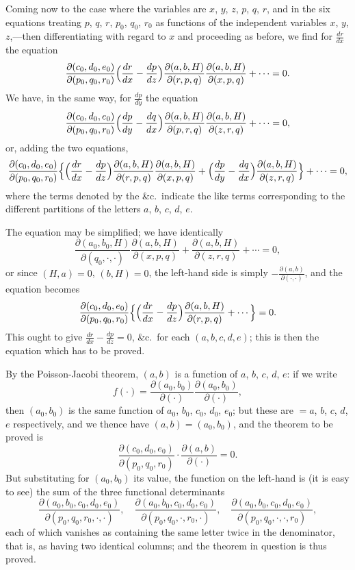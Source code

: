 \documentclass[11pt,a4paper]{book}
\begin{document}
Coming now to the case where the variables are $x$, $y$, $z$, $p$, $q$, $r$, and in the six equations treating $p$, $q$, $r$, $p_0$, $q_0$, $r_0$ as functions of the independent variables $x$, $y$, $z$,---then differentiating with regard to $x$ and proceeding as before, we find for $\frac{dr}{dx}$ the equation
\[
\frac{\partial(c_0, d_0, e_0)}{\partial(p_0, q_0, r_0)} \Bigl(\frac{dr}{dx} - \frac{dp}{dz}\Bigr) \frac{\partial(a, b, H)}{\partial(r, p, q)} \frac{\partial(a, b, H)}{\partial(x, p, q)} + \cdots = 0.
\]
We have, in the same way, for $\frac{dp}{dy}$ the equation
\[
\frac{\partial(c_0, d_0, e_0)}{\partial(p_0, q_0, r_0)} \Bigl(\frac{dp}{dy} - \frac{dq}{dx}\Bigr) \frac{\partial(a, b, H)}{\partial(p, r, q)} \frac{\partial(a, b, H)}{\partial(z, r, q)} + \cdots = 0,
\]
or, adding the two equations,
\[
\frac{\partial(c_0, d_0, e_0)}{\partial(p_0, q_0, r_0)} \Bigl\{\Bigl(\frac{dr}{dx} - \frac{dp}{dz}\Bigr) \frac{\partial(a, b, H)}{\partial(r, p, q)} \frac{\partial(a, b, H)}{\partial(x, p, q)} + \Bigl(\frac{dp}{dy} - \frac{dq}{dx}\Bigr) \frac{\partial(a, b, H)}{\partial(z, r, q)}\Bigr\} + \cdots = 0,
\]
where the terms denoted by the \&c.~indicate the like terms corresponding to the different partitions of the letters $a$, $b$, $c$, $d$, $e$.

The equation may be simplified; we have identically
\[
\frac{\partial(a_0, b_0, H)}{\partial(q_0, \cdot, \cdot)} \frac{\partial(a, b, H)}{\partial(x, p, q)} + \frac{\partial(a, b, H)}{\partial(z, r, q)} + \cdots = 0,
\]
or since $(H, a) = 0$, $(b, H) = 0$, the left-hand side is simply $-\frac{\partial(a, b)}{\partial(\cdot, \cdot)}$, and the equation becomes
\[
\frac{\partial(c_0, d_0, e_0)}{\partial(p_0, q_0, r_0)} \Bigl\{\Bigl(\frac{dr}{dx} - \frac{dp}{dz}\Bigr) \frac{\partial(a, b, H)}{\partial(r, p, q)} + \cdots\Bigr\} = 0.
\]
This ought to give $\frac{dr}{dx} - \frac{dp}{dz} = 0$, \&c.~for each $(a, b, c, d, e)$; this is then the equation which has to be proved.

By the Poisson-Jacobi theorem, $(a, b)$ is a function of $a$, $b$, $c$, $d$, $e$: if we write
\[
f(\cdot) = \frac{\partial(a_0, b_0)}{\partial(\cdot)} \frac{\partial(a_0, b_0)}{\partial(\cdot)},
\]
then $(a_0, b_0)$ is the same function of $a_0$, $b_0$, $c_0$, $d_0$, $e_0$; but these are $= a$, $b$, $c$, $d$, $e$ respectively, and we thence have $(a, b) = (a_0, b_0)$, and the theorem to be proved is
\[
\frac{\partial(c_0, d_0, e_0)}{\partial(p_0, q_0, r_0)} \cdot \frac{\partial(a, b)}{\partial(\cdot)} = 0.
\]
But substituting for $(a_0, b_0)$ its value, the function on the left-hand is (it is easy to see) the sum of the three functional determinants
\[
\frac{\partial(a_0, b_0, c_0, d_0, e_0)}{\partial(p_0, q_0, r_0, \cdot, \cdot)}, \quad
\frac{\partial(a_0, b_0, c_0, d_0, e_0)}{\partial(p_0, q_0, \cdot, r_0, \cdot)}, \quad
\frac{\partial(a_0, b_0, c_0, d_0, e_0)}{\partial(p_0, q_0, \cdot, \cdot, r_0)},
\]
each of which vanishes as containing the same letter twice in the denominator, that is, as having two identical columns; and the theorem in question is thus proved.
\end{document}
